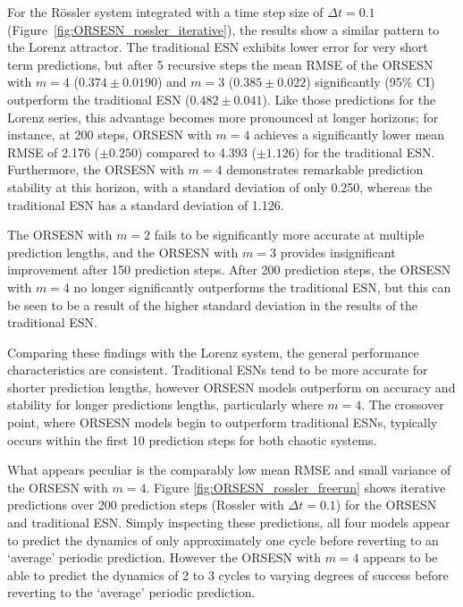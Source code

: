 For the R\"ossler system integrated with a time step size of $\Delta t=0.1$ (Figure~\ref{fig:ORSESN_rossler_iterative}), the results show a similar pattern to the Lorenz attractor. The traditional ESN exhibits lower error for very short term predictions, but after 5 recursive steps the mean RMSE of the ORSESN with $m=4$ ($0.374 \pm 0.0190$) and $m=3$ ($0.385 \pm 0.022$) significantly (95\% CI) outperform the traditional ESN ($0.482 \pm 0.041$). Like those predictions for the Lorenz series, this advantage becomes more pronounced at longer horizons; for instance, at 200 steps, ORSESN with $m=4$ achieves a significantly lower mean RMSE of 2.176 ($\pm 0.250$) compared to 4.393 ($\pm 1.126$) for the traditional ESN. Furthermore, the ORSESN with $m=4$ demonstrates remarkable prediction stability at this horizon, with a standard deviation of only 0.250, whereas the traditional ESN has a standard deviation of 1.126.

The ORSESN with $m=2$ fails to be significantly more accurate at multiple prediction lengths, and the ORSESN with $m=3$ provides insignificant improvement after 150 prediction steps. After 200 prediction steps, the ORSESN with $m=4$ no longer significantly outperforms the traditional ESN, but this can be seen to be a result of the higher standard deviation in the results of the traditional ESN.

Comparing these findings with the Lorenz system, the general performance characteristics are consistent. Traditional ESNs tend to be more accurate for shorter prediction lengths, however ORSESN models outperform on accuracy and stability for longer predictions lengths, particularly where $m=4$.
The crossover point, where ORSESN models begin to outperform traditional ESNs, typically occurs within the first 10 prediction steps for both chaotic systems.

What appears peculiar is the comparably low mean RMSE and small variance of the ORSESN with $m=4$. Figure \ref{fig:ORSESN_rossler_freerun} shows iterative predictions over 200 prediction steps (Rossler with $\Delta t = 0.1$) for the ORSESN and traditional ESN. Simply inspecting these predictions, all four models appear to predict the dynamics of only approximately one cycle before reverting to an `average' periodic prediction. However the ORSESN with $m=4$ appears to be able to predict the dynamics of 2 to 3 cycles to varying degrees of success before reverting to the `average' periodic prediction.



